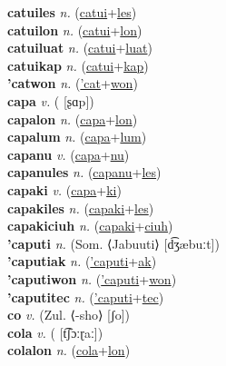 \textbf{catuiles} \textit{n.} (\hyperref[catui]{catui}+\hyperref[les]{les})
 \label{catuiles} \\
\textbf{catuilon} \textit{n.} (\hyperref[catui]{catui}+\hyperref[lon]{lon})
 \label{catuilon} \\
\textbf{catuiluat} \textit{n.} (\hyperref[catui]{catui}+\hyperref[luat]{luat})
 \label{catuiluat} \\
\textbf{catuikap} \textit{n.} (\hyperref[catui]{catui}+\hyperref[kap]{kap})
 \label{catuikap} \\
\textbf{'catwon} \textit{n.} (\hyperref['cat]{'cat}+\hyperref[won]{won})
 \label{'catwon} \\
\textbf{capa} \textit{v.} ( [ʂɑp])
 \label{capa} \\
\textbf{capalon} \textit{n.} (\hyperref[capa]{capa}+\hyperref[lon]{lon})
 \label{capalon} \\
\textbf{capalum} \textit{n.} (\hyperref[capa]{capa}+\hyperref[lum]{lum})
 \label{capalum} \\
\textbf{capanu} \textit{v.} (\hyperref[capa]{capa}+\hyperref[nu]{nu})
 \label{capanu} \\
\textbf{capanules} \textit{n.} (\hyperref[capanu]{capanu}+\hyperref[les]{les})
 \label{capanules} \\
\textbf{capaki} \textit{v.} (\hyperref[capa]{capa}+\hyperref[ki]{ki})
 \label{capaki} \\
\textbf{capakiles} \textit{n.} (\hyperref[capaki]{capaki}+\hyperref[les]{les})
 \label{capakiles} \\
\textbf{capakiciuh} \textit{n.} (\hyperref[capaki]{capaki}+\hyperref[ciuh]{ciuh})
 \label{capakiciuh} \\
\textbf{'caputi} \textit{n.} (Som. ⟨Jabuuti⟩ [d͡ʒæbuːt])
 \label{'caputi} \\
\textbf{'caputiak} \textit{n.} (\hyperref['caputi]{'caputi}+\hyperref[ak]{ak})
 \label{'caputiak} \\
\textbf{'caputiwon} \textit{n.} (\hyperref['caputi]{'caputi}+\hyperref[won]{won})
 \label{'caputiwon} \\
\textbf{'caputitec} \textit{n.} (\hyperref['caputi]{'caputi}+\hyperref[tec]{tec})
 \label{'caputitec} \\
\textbf{co} \textit{v.} (Zul. ⟨-sho⟩ [ʃo])
 \label{co} \\
\textbf{cola} \textit{v.} ( [t͡ʃɔːɽaː])
 \label{cola} \\
\textbf{colalon} \textit{n.} (\hyperref[cola]{cola}+\hyperref[lon]{lon})
 \label{colalon} \\
